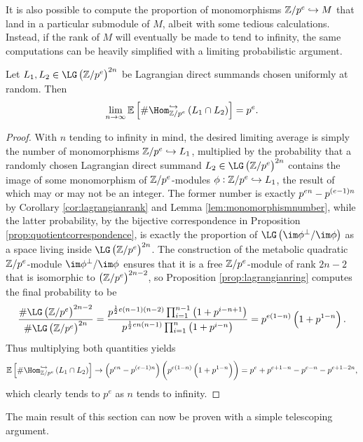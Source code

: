 It is also possible to compute the proportion of monomorphisms $ \mathbb{Z} / p^e \hookrightarrow M $ that land in a particular submodule of $ M $, albeit with some tedious calculations. Instead, if the rank of $ M $ will eventually be made to tend to infinity, the same computations can be heavily simplified with a limiting probabilistic argument.

\begin{proposition}
\label{prop:averagesummand}
Let $ L_1, L_2 \in \LG\br{\ZZ / p^e}^{2n} $ be Lagrangian direct summands chosen uniformly at random. Then
$$ \lim_{n \to \infty} \EE\sbr{\#\Hom_{\ZZ / p^e}^{\hookrightarrow}\br{L_1 \cap L_2}} = p^e. $$
\end{proposition}

\begin{proof}
With $ n $ tending to infinity in mind, the desired limiting average is simply the number of monomorphisms $ \mathbb{Z} / p^e \hookrightarrow L_1 $, multiplied by the probability that a randomly chosen Lagrangian direct summand $ L_2 \in \LG\br{\ZZ / p^e}^{2n} $ contains the image of some monomorphism of $ \mathbb{Z} / p^e $-modules $ \phi : \mathbb{Z} / p^e \hookrightarrow L_1 $, the result of which may or may not be an integer. The former number is exactly $ p^{en} - p^{\br{e - 1}n} $ by Corollary \ref{cor:lagrangianrank} and Lemma \ref{lem:monomorphismnumber}, while the latter probability, by the bijective correspondence in Proposition \ref{prop:quotientcorrespondence}, is exactly the proportion of $ \LG\br{\im \phi^\perp / \im \phi} $ as a space living inside $ \LG\br{\ZZ / p^e}^{2n} $. The construction of the metabolic quadratic $ \mathbb{Z} / p^e $-module $ \im \phi^\perp / \im \phi $ ensures that it is a free $ \mathbb{Z} / p^e $-module of rank $ 2n - 2 $ that is isomorphic to $ \br{\ZZ / p^e}^{2n - 2} $, so Proposition \ref{prop:lagrangianring} computes the final probability to be
$$ \dfrac{\#\LG\br{\ZZ / p^e}^{2n - 2}}{\#\LG\br{\ZZ / p^e}^{2n}} = \dfrac{p^{\frac{1}{2}e\br{n - 1}\br{n - 2}}\prod_{i = 1}^{n - 1} \br{1 + p^{i - n + 1}}}{p^{\frac{1}{2}en\br{n - 1}}\prod_{i = 1}^n \br{1 + p^{i - n}}} = p^{e\br{1 - n}}\br{1 + p^{1 - n}}. $$
Thus multiplying both quantities yields
$$ \EE\sbr{\#\Hom_{\ZZ / p^e}^{\hookrightarrow}\br{L_1 \cap L_2}} \to \br{p^{en} - p^{\br{e - 1}n}}\br{p^{e\br{1 - n}}\br{1 + p^{1 - n}}} = p^e + p^{e + 1 - n} - p^{e - n} - p^{e + 1 - 2n}, $$
which clearly tends to $ p^e $ as $ n $ tends to infinity.
\end{proof}

The main result of this section can now be proven with a simple telescoping argument.

